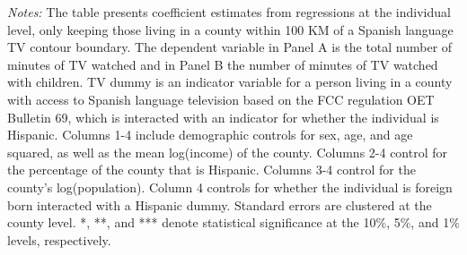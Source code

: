 \begin{table}[!htbp]
{\begin{threeparttable}
\begin{tablenotes}[flushleft]
				\item \textit{Notes:} The table presents coefficient estimates from regressions at the individual level, only keeping those living in a county within 100 KM of a Spanish language TV contour boundary. The dependent variable in Panel A is the total number of minutes of TV watched and in Panel B the number of minutes of TV watched with children. TV dummy is an indicator variable for a person living in a county with access to Spanish language television based on the FCC regulation OET Bulletin 69, which is interacted with an indicator for whether the individual is Hispanic. Columns 1-4 include demographic controls for sex, age, and age squared, as well as the mean log(income) of the county. Columns 2-4 control for the percentage of the county that is Hispanic. Columns 3-4 control for the county's log(population). Column 4 controls for whether the individual is foreign born interacted with a Hispanic dummy. Standard errors are clustered at the county level. *, **, and *** denote statistical significance at the 10\%, 5\%, and 1\% levels, respectively.
			\end{tablenotes}
		\end{threeparttable}
	}
\end{table}